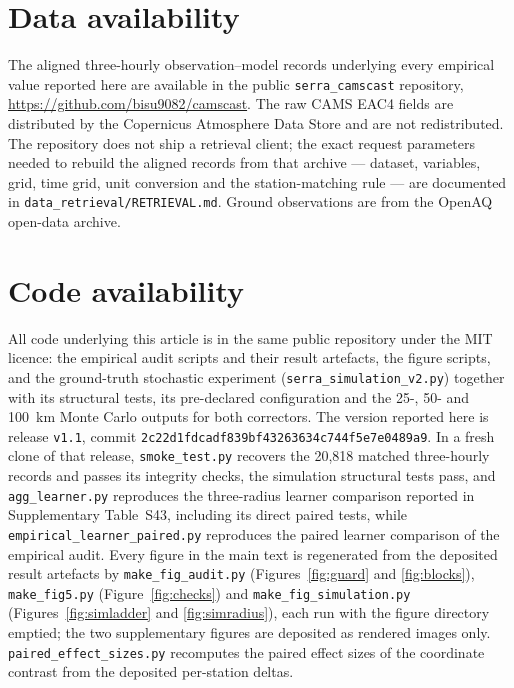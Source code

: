 \documentclass[preprint,12pt]{elsarticle}
\begin{document}
\section*{Data availability}
The aligned three-hourly observation--model records underlying every empirical value reported
here are available in the public \texttt{serra\_camscast} repository,
\url{https://github.com/bisu9082/camscast}. The raw CAMS EAC4 fields are distributed by
the Copernicus Atmosphere Data Store and are not redistributed. The repository does not ship a
retrieval client; the exact request parameters needed to rebuild the aligned records from that
archive --- dataset, variables, grid, time grid, unit conversion and the station-matching rule ---
are documented in \texttt{data\_retrieval/RETRIEVAL.md}. Ground observations are from the OpenAQ
open-data archive.

\section*{Code availability}
All code underlying this article is in the same public repository under the MIT licence:
the empirical audit scripts and their result artefacts, the figure scripts, and the
ground-truth stochastic experiment (\texttt{serra\_simulation\_v2.py}) together with its
structural tests, its pre-declared configuration and the 25-, 50- and 100~km Monte Carlo
outputs for both correctors. The version reported here is release \texttt{v1.1}, commit
\texttt{2c22d1fdcadf839bf43263634c744f5e7e0489a9}. In a fresh clone of that release,
\texttt{smoke\_test.py} recovers the 20,818 matched three-hourly records and passes its
integrity checks, the simulation structural tests pass, and \texttt{agg\_learner.py}
reproduces the three-radius learner comparison reported in Supplementary Table~S43, including its direct paired tests, while \texttt{empirical\_learner\_paired.py} reproduces the paired learner comparison of the empirical audit. Every figure in the main text is
regenerated from the deposited result artefacts by \texttt{make\_fig\_audit.py}
(Figures~\ref{fig:guard} and \ref{fig:blocks}), \texttt{make\_fig5.py}
(Figure~\ref{fig:checks}) and \texttt{make\_fig\_simulation.py}
(Figures~\ref{fig:simladder} and \ref{fig:simradius}), each run with the figure directory
emptied; the two supplementary figures are deposited as rendered images only. \texttt{paired\_effect\_sizes.py} recomputes the paired effect sizes of the coordinate contrast from the deposited per-station deltas.



\end{document}
